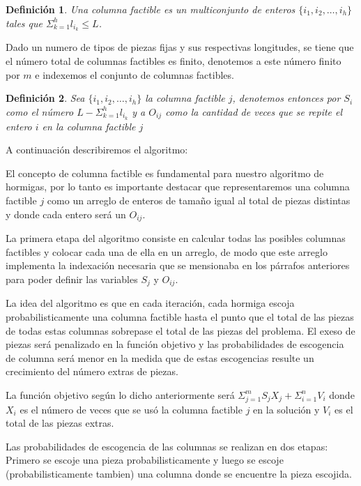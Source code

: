 \documentclass[letterpaper,11pt]{article}
\newtheorem*{definicion}{Definici\'on}
\begin{document}
\begin{definicion}
Una columna factible es un multiconjunto de enteros $\{i_1 ,i_2 ,\dots ,i_h\}$ tales que $\Sigma _{k=1}^h l_{i_k}\leq L$.
\end{definicion}

Dado un numero de tipos de piezas fijas y sus respectivas longitudes, se tiene que el n\'umero 
total de columnas factibles es finito, denotemos a este n\'umero finito por $m$ e indexemos el conjunto de columnas 
factibles.

\begin{definicion}
Sea $\{i_1 ,i_2,\dots ,i_h\}$ la columna factible $j$, denotemos entonces por $S_i$ como el n\'umero $L-\Sigma _{k=1}^h l_{i_k}$ 
y a $O_{ij}$ como la cantidad de veces que se repite el entero $i$ en la columna factible $j$ 
\end{definicion}

A continuaci\'on describiremos el algoritmo:

El concepto de columna factible es fundamental para nuestro algoritmo de hormigas, por lo tanto es importante destacar que representaremos 
una columna factible $j$ como un arreglo de enteros de tama\~no igual al total de piezas distintas y donde cada entero 
ser\'a un $O_{ij}$.

La primera etapa del algoritmo consiste en calcular todas las posibles columnas factibles y colocar cada una de ella en un 
arreglo, de modo que este arreglo implementa la indexaci\'on necesaria que se mensionaba en los p\'arrafos anteriores para poder definir 
las variables $S_j$ y $O_{ij}$.

La idea del algoritmo es que en cada iteraci\'on, cada hormiga escoja probabilisticamente una columna factible hasta el punto que el 
total de las piezas de todas estas columnas sobrepase el total de las piezas del problema. El exeso de piezas ser\'a penalizado en la 
funci\'on objetivo y las probabilidades de escogencia de columna ser\'a menor en la medida que de estas escogencias resulte un crecimiento del n\'umero 
extras de piezas.

La funci\'on objetivo seg\'un lo dicho anteriormente ser\'a $\Sigma _{j=1}^m S_jX_j+\Sigma _{i=1}^n V_i$ donde $X_i$ es el n\'umero de veces 
que se us\'o la columna factible $j$ en la soluci\'on y $V_i$ es el total de las piezas extras.

Las probabilidades de escogencia de las columnas se realizan en dos etapas: Primero se escoje una pieza probabilisticamente y luego se escoje 
(probabilisticamente tambien) una columna donde se encuentre la pieza escojida.
\end{document}
